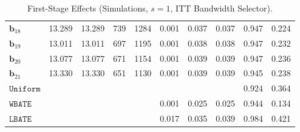 \documentclass[10pt]{article}
\newcommand{\bb}{\mathbf{b}}
\begin{document}
\begin{table}[p]
\begin{tabular}{lccccrrrrr}
$\bb_{18}$ & 13.289 & 13.289 & 739 & 1284 & 0.001 & 0.037 & 0.037 & 0.947 & 0.224 \\
$\bb_{19}$ & 13.011 & 13.011 & 697 & 1195 & 0.001 & 0.038 & 0.038 & 0.947 & 0.232 \\
$\bb_{20}$ & 13.077 & 13.077 & 671 & 1154 & 0.001 & 0.039 & 0.039 & 0.947 & 0.236 \\
$\bb_{21}$ & 13.330 & 13.330 & 651 & 1130 & 0.001 & 0.039 & 0.039 & 0.945 & 0.238 \\
\midrule
$\mathtt{Uniform}$ &  &  &  &  &  &  &  & 0.924 & 0.364 \\
\midrule
$\mathtt{WBATE}$ &  &  &  &  & 0.001 & 0.025 & 0.025 & 0.944 & 0.134 \\
\midrule
$\mathtt{LBATE}$ &  &  &  &  & 0.017 & 0.035 & 0.039 & 0.984 & 0.421 \\
\bottomrule\bottomrule
\end{tabular}

    \caption{First-Stage Effects (Simulations, $s=1$, ITT Bandwidth Selector).}
    \label{tab:sa-simuls-fs-s1}
\end{table}
\end{document}
